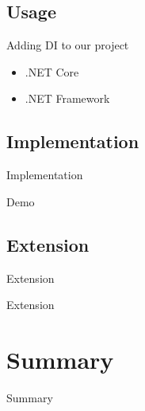 \documentclass{beamer}
\begin{document}
\subsection*{Usage}
\begin{frame}{Adding DI to our project}
\begin{center}
\Large{\begin{itemize}
	\item .NET Core
	\item .NET Framework
\end{itemize}}
\end{center}
\end{frame}

\subsection*{Implementation}
\begin{frame}{Implementation}
\begin{center}
\Huge{Demo}
\end{center}
\end{frame}

\subsection*{Extension}
\begin{frame}{Extension}
\begin{center}
\Huge{Extension}
\end{center}
\end{frame}	


\section{Summary}

\begin{frame}{}
\begin{center}
\Huge{Summary}
\end{center}
\end{frame}
\end{document}
